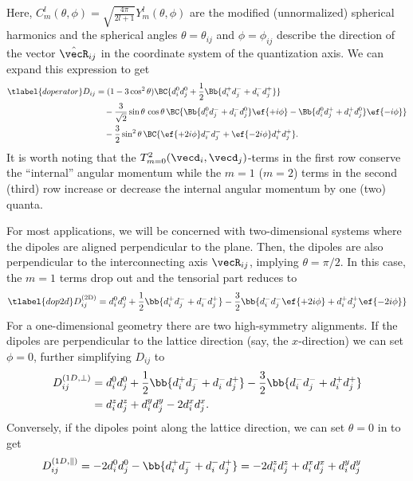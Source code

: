 Here, $C^l_m(\theta,\phi)=\sqrt{\frac{4\pi}{2l+1}} Y^l_m(\theta,\phi)$ are the modified (unnormalized) spherical harmonics and the spherical angles $\theta = \theta_{ij}$ and $\phi = \phi_{ij}$ describe the direction of the vector $\hat{\vecR}_{ij}$ in the coordinate system of the quantization axis. We can expand this expression to get
\begin{align}\tlabel{doperator}
    D_{ij} &= (1-3\cos^2 \theta) \BC{ d_i^0 d_j^0 + \frac{1}{2}\Bb{d_i^+ d_j^- + d_i^- d_j^+} } \\
           &\quad -\frac{3}{\sqrt{2}}\sin\theta \,\cos\theta\, \BC{ \Bb{ d_i^0 d_j^- + d_i^- d_j^0 } \ef{+i\phi} - \Bb{ d_i^0 d_j^+ + d_i^+ d_j^0 } \ef{-i\phi} } \\
           &\quad -\frac{3}{2}\sin^2\theta \, \BC{ \ef{+2i\phi} d_i^- d_j^- + \ef{-2i\phi} d_i^+ d_j^+ }.
\end{align}
It is worth noting that the $T^2_{m=0}(\vecd_i, \vecd_j)$-terms in the first row conserve the ``internal'' angular momentum while the $m=1$ ($m=2$) terms in the second (third) row increase or decrease the internal angular momentum by one (two) quanta.

For most applications, we will be concerned with two-dimensional systems where the dipoles are aligned perpendicular to the plane. Then, the dipoles are also perpendicular to the interconnecting axis $\vecR_{ij}$, implying $\theta = \pi/2$. In this case, the $m=1$ terms drop out and the tensorial part reduces to
\begin{align} \tlabel{dop2d}
    D^\text{(2D)}_{ij} = d_i^0 d_j^0 + \frac{1}{2}\bb{d_i^+ d_j^- + d_i^- d_j^+} -\frac{3}{2} \bb{ d_i^- d_j^- \ef{+2i\phi} + d_i^+ d_j^+ \ef{-2i\phi} }
\end{align}
For a one-dimensional geometry there are two high-symmetry alignments. If the dipoles are perpendicular to the lattice direction (say, the $x$-direction) we can set $\phi=0$, further simplifying $D_{ij}$ to
\begin{align}
    D_{ij}^{(1D,\perp)} &= d_i^0 d_j^0 + \frac{1}{2}\bb{d_i^+ d_j^- + d_i^- d_j^+} -\frac{3}{2} \bb{d_i^- d_j^- + d_i^+ d_j^+} \\
 &= d_i^z d_j^z + d_i^y d_j^y - 2 d_i^x d_j^x.
\end{align}
Conversely, if the dipoles point along the lattice direction, we can set $\theta=0$ in  to get
\begin{align}
    D^{(1D,\parallel)}_{ij} &= -2 d_i^0 d_j^0 - \bb{d_i^+ d_j^- + d_i^- d_j^+} = -2 d_i^z d_j^z+ d_i^x d_j^x + d_i^y d_j^y
\end{align}

